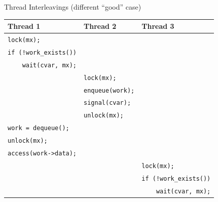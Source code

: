 \documentclass[xcolor=dvipsnames]{beamer}
\begin{document}
\begin{frame}{Thread Interleavings (different ``good'' case)}
	\begin{center}
		\begin{tabular}{|l|l|l|}
			\hline
			\cellcolor{thread1} {\bf Thread 1} & \cellcolor{thread2} {\bf Thread 2} & \cellcolor{thread3} {\bf Thread 3} \\
			\hline
			\small \texttt{lock(mx);} & & \\
			\small \texttt{if~(!work\_exists())} & & \\
			\small \texttt{~~~~wait(cvar,~mx);} & & \\

			& \small \texttt{lock(mx);} & \\
			& \small \texttt{enqueue(work);} & \\
			& \small \texttt{signal(cvar);} & \\
			& \small \texttt{unlock(mx);} & \\

			\small \texttt{work~=~dequeue();~} & & \\
			\small \texttt{unlock(mx);} & & \\
			\small \texttt{access(work->data);}& & \\

			& & \small \texttt{lock(mx);} \\
			& & \small \texttt{if~(!work\_exists())} \\
			& & \small \texttt{~~~~wait(cvar,~mx);} \\
			\hline
		\end{tabular}
	\end{center}
\end{frame}
\end{document}
